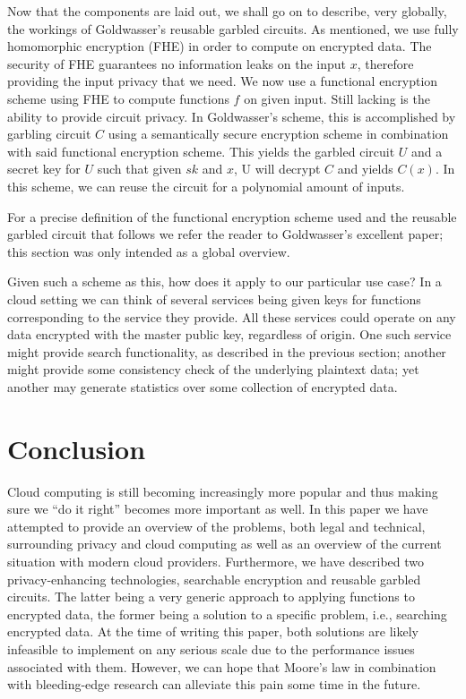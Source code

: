 \documentclass[12pt]{article}
\begin{document}
Now that the components are laid out, we shall go on to describe, very globally, the workings of Goldwasser's reusable garbled circuits.
As mentioned, we use fully homomorphic encryption (FHE) in order to compute on encrypted data.
The security of FHE guarantees no information leaks on the input $x$, therefore providing the input privacy that we need.
We now use a functional encryption scheme using FHE to compute functions $f$ on given input.
Still lacking is the ability to provide circuit privacy.
In Goldwasser's scheme, this is accomplished by garbling circuit $C$ using a semantically secure encryption scheme in combination with said functional encryption scheme.
This yields the garbled circuit $U$ and a secret key for $U$ such that given $sk$ and $x$, U will decrypt $C$ and yields $C(x)$.
In this scheme, we can reuse the circuit for a polynomial amount of inputs.

For a precise definition of the functional encryption scheme used and the reusable garbled circuit that follows we refer the reader to Goldwasser's excellent paper; this section was only intended as a global overview.

Given such a scheme as this, how does it apply to our particular use case?
In a cloud setting we can think of several services being given keys for functions corresponding to the service they provide.
All these services could operate on any data encrypted with the master public key, regardless of origin.
One such service might provide search functionality, as described in the previous section;
another might provide some consistency check of the underlying plaintext data;
yet another may generate statistics over some collection of encrypted data.

\section{Conclusion}
\label{sec:conclusion}

Cloud computing is still becoming increasingly more popular and thus making sure we ``do it right'' becomes more important as well.
In this paper we have attempted to provide an overview of the problems, both legal and technical, surrounding privacy and cloud computing as well as an overview of the current situation with modern cloud providers.
Furthermore, we have described two privacy-enhancing technologies, searchable encryption and reusable garbled circuits.
The latter being a very generic approach to applying functions to encrypted data, the former being a solution to a specific problem, i.e., searching encrypted data.
At the time of writing this paper, both solutions are likely infeasible to implement on any serious scale due to the performance issues associated with them.
However, we can hope that Moore's law in combination with bleeding-edge research can alleviate this pain some time in the future.
\end{document}
